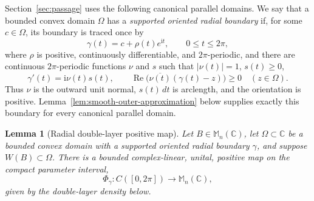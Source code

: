 \documentclass[preprints,article,submit,oneauthor]{Definitions/mdpi}
\newcounter{manuscriptresult}[section]
\theoremstyle{mdpi}
\newtheorem{lemma}[manuscriptresult]{Lemma}
\theoremstyle{definition}
\newcommand{\C}{\mathbb C}
\newcommand{\Mn}{\mathbb M_n(\C)}
\newcommand{\RePart}{\operatorname{Re}}
\newcommand{\iu}{\mathrm{i}}
\begin{document}
Section~\ref{sec:passage} uses the following canonical parallel
domains.  We say that a bounded convex domain $\Omega$ has a
\emph{supported oriented radial boundary} if, for some $c\in\Omega$,
its boundary is traced once by
\[
  \gamma(t)=c+\rho(t)e^{\iu t},\qquad 0\leq t\leq2\pi,
\]
where $\rho$ is positive, continuously differentiable, and
$2\pi$-periodic, and there are continuous $2\pi$-periodic functions
$\nu$ and $s$ such that $\lvert\nu(t)\rvert=1$, $s(t)\geq0$,
\begin{equation}
  \gamma'(t)=\iu\nu(t)s(t),
  \qquad
  \RePart\bigl(\overline{\nu(t)}(\gamma(t)-z)\bigr)\geq0
  \quad(z\in\Omega).
  \label{eq:oriented-radial-boundary}
\end{equation}
Thus $\nu$ is the outward unit normal, $s(t)\,dt$ is arclength, and
the orientation is positive.  Lemma~\ref{lem:smooth-outer-approximation}
below supplies exactly this boundary for every canonical parallel
domain.

\begin{lemma}[Radial double-layer positive map]
\label{lem:double-layer-map}
Let $B\in\Mn$, let $\Omega\subset\C$ be a bounded convex domain with a
supported oriented radial boundary $\gamma$, and suppose
$W(B)\subset\Omega$.  There is a bounded complex-linear, unital,
positive map on the compact parameter interval,
\[
  \Phi_\gamma\colon C([0,2\pi])\longrightarrow\Mn,
\]
given by the double-layer density below.
\end{lemma}
\end{document}
